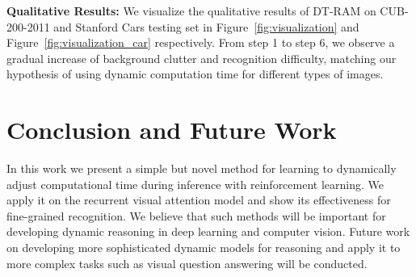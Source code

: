 \documentclass[10pt,twocolumn,letterpaper]{article}
\begin{document}


\textbf{Qualitative Results:} We visualize the qualitative results of DT-RAM on CUB-200-2011 and Stanford Cars testing set in Figure~\ref{fig:visualization} and Figure~\ref{fig:visualization_car} respectively.
From step 1 to step 6, we observe a gradual increase of background clutter and recognition difficulty, matching our hypothesis of using dynamic computation time for different types of images.


\section{Conclusion and Future Work}

In this work we present a simple but novel method for learning to dynamically adjust computational time during inference with reinforcement learning.
We apply it on the recurrent visual attention model and show its effectiveness for fine-grained recognition.
We believe that such methods will be important for developing dynamic reasoning in deep learning and computer vision.
Future work on developing more sophisticated dynamic models for reasoning and apply it to more complex tasks such as visual question answering will be conducted.

{\small


}
\end{document}
